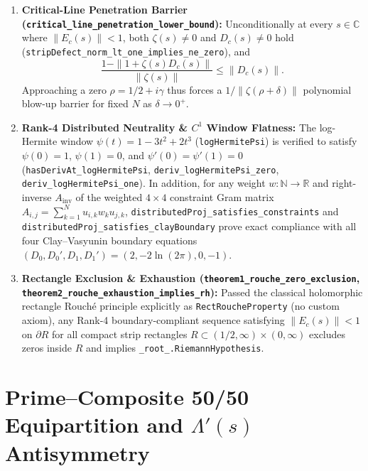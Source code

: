 \documentclass[11pt,a4paper]{article}
\theoremstyle{definition}
\newcommand{\Nset}{\mathbb{N}}
\newcommand{\Rset}{\mathbb{R}}
\newcommand{\Cfield}{\mathbb{C}}
\begin{document}
\begin{enumerate}[label=(\arabic*),noitemsep]
  \item \textbf{Critical-Line Penetration Barrier (\texttt{critical\_\allowbreak line\_\allowbreak penetration\_\allowbreak lower\_\allowbreak bound}):} Unconditionally at every $s \in \Cfield$ where $\|E_c(s)\| < 1$, both $\zeta(s) \neq 0$ and $D_c(s) \neq 0$ hold (\texttt{stripDefect\_\allowbreak norm\_\allowbreak lt\_\allowbreak one\_\allowbreak implies\_\allowbreak ne\_\allowbreak zero}), and
  \begin{equation}
  \frac{1 - \|1 + \zeta(s) D_c(s)\|}{\|\zeta(s)\|} \le \|D_c(s)\|.
  \end{equation}
  Approaching a zero $\rho = 1/2 + i\gamma$ thus forces a $1/\|\zeta(\rho+\delta)\|$ polynomial blow-up barrier for fixed $N$ as $\delta \to 0^+$.
  \item \textbf{Rank-4 Distributed Neutrality \& $C^1$ Window Flatness:} The log-Hermite window $\psi(t) = 1 - 3t^2 + 2t^3$ (\texttt{logHermitePsi}) is verified to satisfy $\psi(0) = 1$, $\psi(1) = 0$, and $\psi'(0) = \psi'(1) = 0$ (\texttt{hasDerivAt\_\allowbreak logHermitePsi}, \texttt{deriv\_\allowbreak logHermitePsi\_\allowbreak zero}, \texttt{deriv\_\allowbreak logHermitePsi\_\allowbreak one}). In addition, for any weight $w : \Nset \to \Rset$ and right-inverse $A_{\mathrm{inv}}$ of the weighted $4 \times 4$ constraint Gram matrix $A_{i,j} = \sum_{k=1}^N u_{i,k} w_k u_{j,k}$, \texttt{distributedProj\_\allowbreak satisfies\_\allowbreak constraints} and \texttt{distributedProj\_\allowbreak satisfies\_\allowbreak clayBoundary} prove exact compliance with all four Clay--Vasyunin boundary equations $(D_0, D_0', D_1, D_1') = (2, -2\ln(2\pi), 0, -1)$.
  \item \textbf{Rectangle Exclusion \& Exhaustion (\texttt{theorem1\_\allowbreak rouche\_\allowbreak zero\_\allowbreak exclusion}, \texttt{theorem2\_\allowbreak rouche\_\allowbreak exhaustion\_\allowbreak implies\_\allowbreak rh}):} Passed the classical holomorphic rectangle Rouch\'e principle explicitly as \texttt{RectRoucheProperty} (no custom axiom), any Rank-4 boundary-compliant sequence satisfying $\|E_c(s)\| < 1$ on $\partial R$ for all compact strip rectangles $R \subset (1/2, \infty) \times (0, \infty)$ excludes zeros inside $R$ and implies \texttt{\_root\_.\allowbreak RiemannHypothesis}.
\end{enumerate}

\section{Prime--Composite 50/50 Equipartition and $\Lambda'(s)$ Antisymmetry}\label{sec:prime_collapse}
\end{document}

